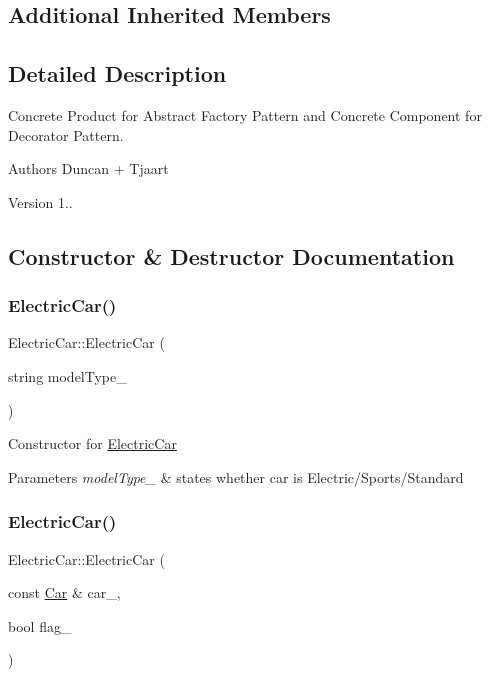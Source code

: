 \subsection*{Additional Inherited Members}


\subsection{Detailed Description}
Concrete Product for Abstract Factory Pattern and Concrete Component for Decorator Pattern. 

\begin{DoxyAuthor}{Authors}
Duncan + Tjaart 
\end{DoxyAuthor}
\begin{DoxyVersion}{Version}
1.. 
\end{DoxyVersion}


\subsection{Constructor \& Destructor Documentation}
\mbox{\label{class_electric_car_a39c61284beee09357e58de1a532e26a0}} 
\subsubsection{\texorpdfstring{Electric\+Car()}{ElectricCar()}\hspace{0.1cm}{\footnotesize\ttfamily [1/2]}}
{\footnotesize\ttfamily Electric\+Car\+::\+Electric\+Car (\begin{DoxyParamCaption}\item[{string}]{model\+Type\+\_\+ }\end{DoxyParamCaption})}

Constructor for \mbox{\hyperlink{class_electric_car}{Electric\+Car}} 
\begin{DoxyParams}{Parameters}
{\em model\+Type\+\_\+} & states whether car is Electric/\+Sports/\+Standard \\
\hline
\end{DoxyParams}
\mbox{\label{class_electric_car_a552446ff18f08c5e3420c4a9f7a86e77}} 
\subsubsection{\texorpdfstring{Electric\+Car()}{ElectricCar()}\hspace{0.1cm}{\footnotesize\ttfamily [2/2]}}
{\footnotesize\ttfamily Electric\+Car\+::\+Electric\+Car (\begin{DoxyParamCaption}\item[{const \mbox{\hyperlink{class_car}{Car}} \&}]{car\+\_\+,  }\item[{bool}]{flag\+\_\+ }\end{DoxyParamCaption})}

